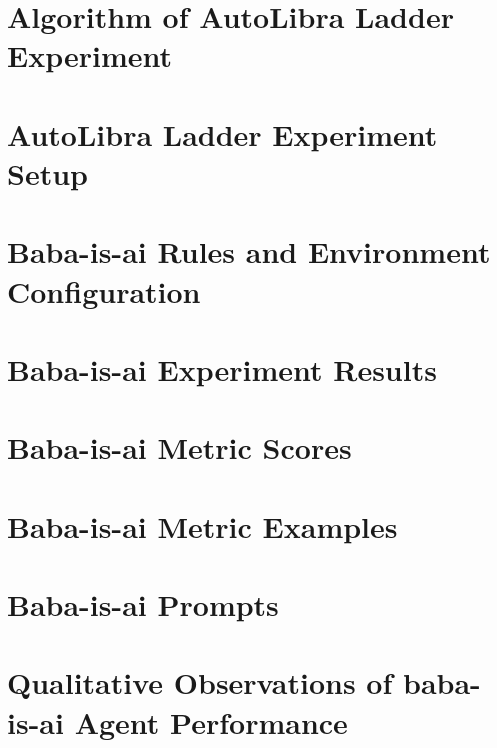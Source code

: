 \newpage

\section{Algorithm of AutoLibra Ladder Experiment}
\label{appendix:algo1}


\section{AutoLibra Ladder Experiment Setup}
\label{appendix:autolibra_setup}


\section{Baba-is-ai Rules and Environment Configuration}
\label{appendix:baba_is_ai_rules}


\section{Baba-is-ai Experiment Results}
\label{appendix:heldout}


\section{Baba-is-ai Metric Scores}
\label{appendix:babaisai}

\newpage

\section{Baba-is-ai Metric Examples}
\label{appendix:babaisai_metrics}

\newpage

\section{Baba-is-ai Prompts}
\label{appendix:babaisai_prompts}

\newpage

\section{Qualitative Observations of baba-is-ai Agent Performance}
\label{appendix:baba_is_ai_obs}

\newpage

